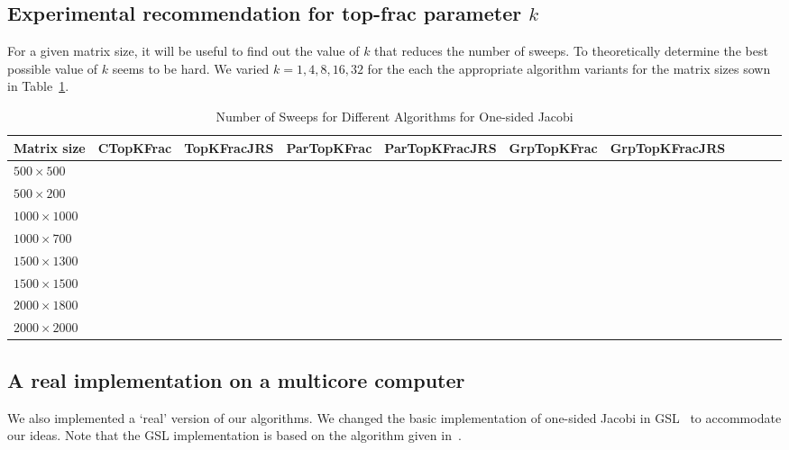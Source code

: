 \documentclass[10pt, conference, compsocconf]{IEEEtran}
\begin{document}
\subsection{Experimental recommendation for top-frac parameter $k$}

For a given matrix size, it will be useful to find out the value of $k$ that reduces the number of sweeps. To theoretically determine the best possible value of $k$ seems to be hard. We varied $k=1,4,8,16,32$ for the each the appropriate algorithm variants for the matrix sizes sown in Table~\ref{tab:varyk}.

\begin{table}
  \centering
  \caption{Number of Sweeps for Different Algorithms for One-sided Jacobi}
  \label{tab:varyk}
  \begin{tabular}{lcccccccccc}
    \toprule
    Matrix size & CTopKFrac & TopKFracJRS & ParTopKFrac & ParTopKFracJRS & GrpTopKFrac & GrpTopKFracJRS \\
    \midrule
    $500 \times 500$   &  \\
    $500 \times 200$   &  \\
    $1000 \times 1000$ &  \\
    $1000 \times 700$  &  \\
    $1500 \times 1300$ &  \\
    $1500 \times 1500$ &  \\
    $2000 \times 1800$ &  \\
    $2000 \times 2000$ &  \\
    \bottomrule
  \end{tabular}
\end{table}


\subsection{A real implementation on a multicore computer}

We also implemented a `real' version of our algorithms. We changed the basic implementation of one-sided Jacobi in GSL~\cite{galassi1996gnu} to accommodate our ideas. Note that the GSL implementation is based on the algorithm given in~\cite{nash1975one}.
\end{document}
